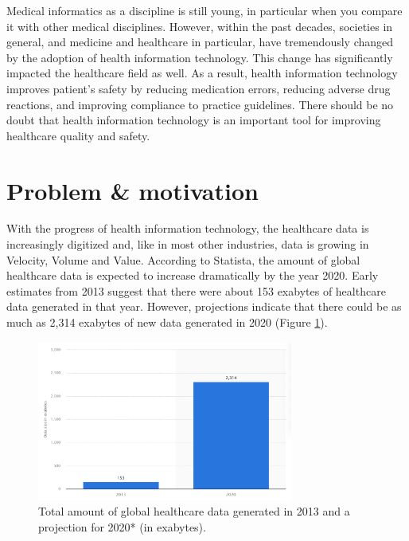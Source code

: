 Medical informatics as a discipline is still young, in particular when you compare it with other medical disciplines. However, within the past decades, societies in general, and medicine and healthcare in particular, have tremendously changed by the adoption of health information technology. This change has significantly impacted the healthcare field as well\cite{haux2010medical}. As a result,  health information technology improves patient’s safety by reducing medication errors, reducing adverse drug reactions, and improving compliance to practice guidelines. There should be no doubt that health information technology is an important tool for improving healthcare quality and safety\cite{alotaibi2017impact}.


\section{Problem \& motivation}
With the progress of health information technology, the healthcare data is increasingly digitized and, like in most other industries, data is growing in Velocity, Volume and Value. According to Statista\cite{HealthcareDataVolume}, the amount of global healthcare data is expected to increase dramatically by the year 2020. Early estimates from 2013 suggest that there were about 153 exabytes of healthcare data generated in that year. However, projections indicate that there could be as much as 2,314 exabytes of new data generated in 2020 (Figure \ref{fig:dataGenerated}).

\begin{figure}[h!]
    \center
    \includegraphics[width=0.75\textwidth]{images/intro/sista.PNG}
    \caption{Total amount of global healthcare data generated in 2013 and a projection for 2020* (in exabytes).}
    \label{fig:dataGenerated}
  \end{figure}

